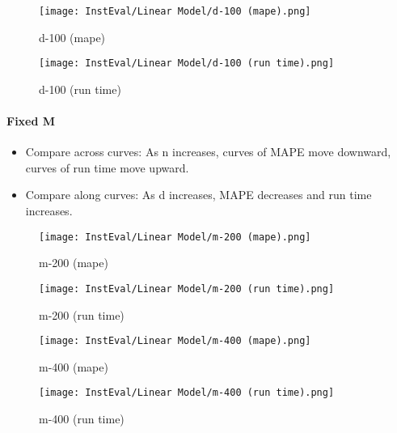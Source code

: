 \documentclass[12pt]{article}
\begin{document}
\begin{figure}[H]
\centering
    \begin{minipage}{0.45\textwidth}
        \centering
        \texttt{[image: InstEval/Linear Model/d-100 (mape).png]}
        \caption{d-100 (mape)}
        
    \end{minipage}\hfill
    \begin{minipage}{0.45\textwidth}
        \centering
        \texttt{[image: InstEval/Linear Model/d-100 (run time).png]}
        \caption{d-100 (run time)}
    \end{minipage}
\end{figure}

\paragraph{Fixed M}
\begin{itemize}
\item Compare across curves: As n increases, curves of MAPE move downward, curves of run time move upward.
\item Compare along curves: As d increases, MAPE decreases and run time increases. 
\end{itemize}


\begin{figure}[H]
\centering
    \begin{minipage}{0.45\textwidth}
        \centering
        \texttt{[image: InstEval/Linear Model/m-200 (mape).png]}
        \caption{m-200 (mape)}
        
    \end{minipage}\hfill
    \begin{minipage}{0.45\textwidth}
        \centering
        \texttt{[image: InstEval/Linear Model/m-200 (run time).png]}
        \caption{m-200 (run time)}
    \end{minipage}
\end{figure}

\begin{figure}[H]
\centering
    \begin{minipage}{0.45\textwidth}
        \centering
        \texttt{[image: InstEval/Linear Model/m-400 (mape).png]}
        \caption{m-400 (mape)}
        
    \end{minipage}\hfill
    \begin{minipage}{0.45\textwidth}
        \centering
        \texttt{[image: InstEval/Linear Model/m-400 (run time).png]}
        \caption{m-400 (run time)}
    \end{minipage}
\end{figure}
\end{document}
